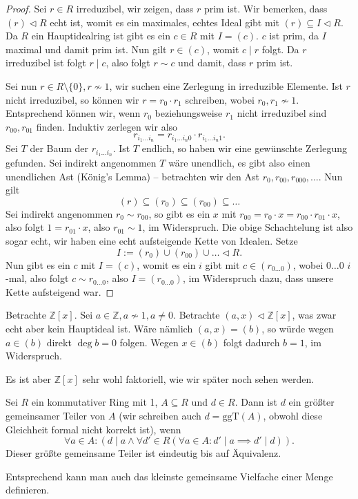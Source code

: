 \begin{proof}
    Sei $r \in R$ irreduzibel, wir zeigen, dass $r$ prim ist. Wir bemerken, dass $ (r) \vartriangleleft R $ echt ist, womit es ein maximales, echtes Ideal gibt mit $(r) \subseteq I \vartriangleleft R$. Da $R$ ein Hauptidealring ist gibt es ein $c \in R$ mit $I = (c)$. $c$ ist prim, da $I$ maximal und damit prim ist. Nun gilt $r \in (c)$, womit $c \mid r$ folgt. Da $r$ irreduzibel ist folgt $r \mid c$, also folgt $r \sim c$ und damit, dass $r$ prim ist.

    Sei nun $r \in R \setminus \{0\}, r \not\sim 1$, wir suchen eine Zerlegung in irreduzible Elemente. Ist $r$ nicht irreduzibel, so können wir $r = r_0 \cdot r_1$ schreiben, wobei $r_0, r_1 \not\sim 1$. Entsprechend können wir, wenn $r_0$ beziehungsweise $r_1$ nicht irreduzibel sind $r_{00}, r_{01}$ finden. Induktiv zerlegen wir also
    $$ r_{i_1 \hdots i_n} = r_{i_1 \hdots i_n 0} \cdot r_{i_1 \hdots i_n 1}. $$
    Sei $T$ der Baum der $r_{i_1 \hdots i_n}$. Ist $T$ endlich, so haben wir eine gewünschte Zerlegung gefunden. Sei indirekt angenommen $T$ wäre unendlich, es gibt also einen unendlichen Ast (König's Lemma) -- \obda betrachten wir den Ast $r_0, r_{00}, r_{000}, \hdots$. Nun gilt
    $$ (r) \subseteq (r_0) \subseteq (r_{00}) \subseteq \hdots $$
    Sei indirekt angenommen $r_0 \sim r_{00}$, so gibt es ein $x$ mit $r_{00} = r_0 \cdot x = r_{00} \cdot r_{01} \cdot x$, also folgt $ 1 = r_{01} \cdot x$, also $r_{01} \sim 1$, im Widerspruch. Die obige Schachtelung ist also sogar echt, wir haben eine echt aufsteigende Kette von Idealen. Setze
    $$ I := (r_0) \cup (r_{00}) \cup \hdots \vartriangleleft R. $$
    Nun gibt es ein $c$ mit $I = (c)$, womit es ein $i$ gibt mit $c \in (r_{0 \hdots 0})$, wobei $0 \hdots 0$ $i$-mal, also folgt $c \sim r_{0 \hdots 0}$, also $I = (r_{0 \hdots 0})$, im Widerspruch dazu, dass unsere Kette aufsteigend war.
\end{proof}

\begin{example}
    Betrachte $\mathbb{Z}[x]$. Sei $a \in \mathbb{Z}, a \not\sim 1, a \neq 0$. Betrachte $({a,x}) \vartriangleleft \mathbb{Z}[x]$, was zwar echt aber kein Hauptideal ist. Wäre nämlich $({a,x}) = (b)$, so würde wegen $a \in (b)$ direkt $\deg b = 0$ folgen. Wegen $x \in (b)$ folgt dadurch $b = 1$, im Widerspruch.

    Es ist aber $\mathbb{Z}[x]$ sehr wohl faktoriell, wie wir später noch sehen werden.
\end{example}

\begin{definition}
    Sei $R$ ein kommutativer Ring mit 1, $A \subseteq R$ und $d \in R$. Dann ist $d$ ein größter gemeinsamer Teiler von $A$ (wir schreiben auch $d = \mathrm{ggT}(A)$, obwohl diese Gleichheit formal nicht korrekt ist), wenn
    $$ \forall a \in A: ( d \mid a \land \forall d' \in R ( \forall a \in A: d' \mid a \implies d' \mid d ) ). $$
    Dieser größte gemeinsame Teiler ist eindeutig bis auf Äquivalenz.

    Entsprechend kann man auch das kleinste gemeinsame Vielfache einer Menge definieren.
\end{definition}